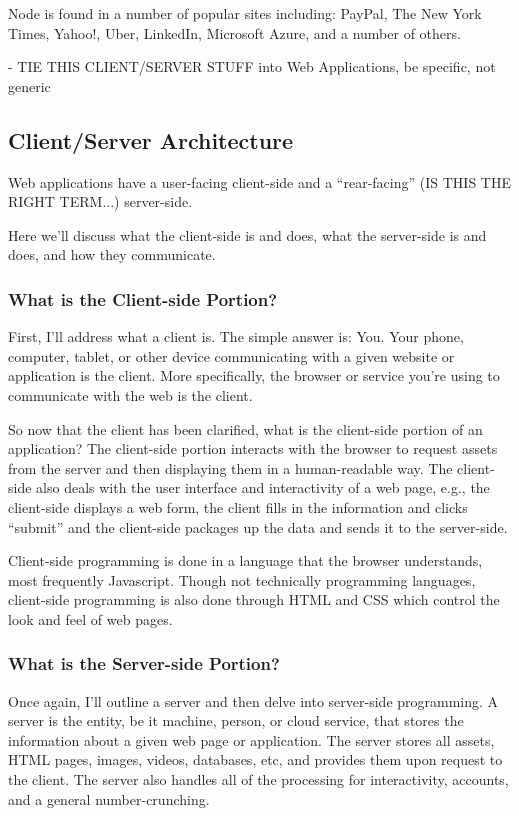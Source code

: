 \documentclass[11pt]{article}
\begin{document}
Node is found in a number of popular sites including: PayPal, The New York Times, Yahoo!, Uber, LinkedIn, Microsoft Azure, and a number of others. \cite{Node}


- TIE THIS CLIENT/SERVER STUFF into Web Applications, be specific, not generic
\subsection{Client/Server Architecture}
Web applications have a user-facing client-side and a ``rear-facing'' (IS THIS THE RIGHT TERM...) server-side.

Here we'll discuss what the client-side is and does, what the server-side is and does, and how they communicate.

\subsubsection{What is the Client-side Portion?}
First, I'll address what a client is. The simple answer is: You. Your phone, computer, tablet, or other device communicating with a given website or application is the client. More specifically, the browser or service you're using to communicate with the web is the client. 

So now that the client has been clarified, what is the client-side portion of an application? The client-side portion interacts with the browser to request assets from the server and then displaying them in a human-readable way. The client-side also deals with the user interface and interactivity of a web page, e.g., the client-side displays a web form, the client fills in the information and clicks ``submit'' and the client-side packages up the data and sends it to the server-side.

Client-side programming is done in a language that the browser understands, most frequently Javascript. Though not technically programming languages, client-side programming is also done through HTML and CSS which control the look and feel of web pages.

\subsubsection{What is the Server-side Portion?}
Once again, I'll outline a server and then delve into server-side programming. A server is the entity, be it machine, person, or cloud service, that stores the information about a given web page or application. The server stores all assets, HTML pages, images, videos, databases, etc, and provides them upon request to the client. The server also handles all of the processing for interactivity, accounts, and a general number-crunching.
\end{document}
